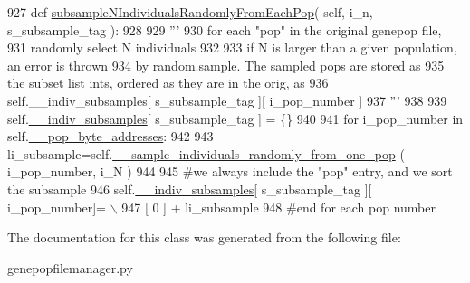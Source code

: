 \begin{DoxyCode}
927     \textcolor{keyword}{def }\hyperlink{classnegui_1_1genepopfilemanager_1_1GenepopFileManager_affaeb9457d84736dc1f289d600808f56}{subsampleNIndividualsRandomlyFromEachPop}( self, i\_n, 
      s\_subsample\_tag ):
928 
929         \textcolor{stringliteral}{'''}
930 \textcolor{stringliteral}{        for each "pop" in the original genepop file,}
931 \textcolor{stringliteral}{        randomly select N individuals}
932 \textcolor{stringliteral}{        }
933 \textcolor{stringliteral}{        if N is larger than a given population, an error is thrown}
934 \textcolor{stringliteral}{        by random.sample.  The sampled pops are stored as }
935 \textcolor{stringliteral}{        the subset list ints, ordered as they are in the orig, as       }
936 \textcolor{stringliteral}{        self.\_\_indiv\_subsamples[ s\_subsample\_tag ][ i\_pop\_number ]}
937 \textcolor{stringliteral}{        '''}
938 
939         self.\hyperlink{classnegui_1_1genepopfilemanager_1_1GenepopFileManager_a1e8379bcee4902ca9314ff53fcb71644}{\_\_indiv\_subsamples}[ s\_subsample\_tag ] = \{\}
940 
941         \textcolor{keywordflow}{for} i\_pop\_number \textcolor{keywordflow}{in} self.\hyperlink{classnegui_1_1genepopfilemanager_1_1GenepopFileManager_ae24c2bdd19136a345bdb42fd49c5d91f}{\_\_pop\_byte\_addresses}:
942             
943             li\_subsample=self.\hyperlink{classnegui_1_1genepopfilemanager_1_1GenepopFileManager_a9818467c9cb40f8e1de0c6cc7f52e263}{\_\_sample\_individuals\_randomly\_from\_one\_pop}
      ( i\_pop\_number, i\_N )
944 
945             \textcolor{comment}{#we always include the "pop" entry, and we sort the subsample}
946             self.\hyperlink{classnegui_1_1genepopfilemanager_1_1GenepopFileManager_a1e8379bcee4902ca9314ff53fcb71644}{\_\_indiv\_subsamples}[ s\_subsample\_tag ][ i\_pop\_number]= \(\backslash\)
947                      [ 0 ] +  li\_subsample
948         \textcolor{comment}{#end for each pop number}
\end{DoxyCode}


The documentation for this class was generated from the following file\+:\begin{DoxyCompactItemize}
\item 
genepopfilemanager.\+py\end{DoxyCompactItemize}

